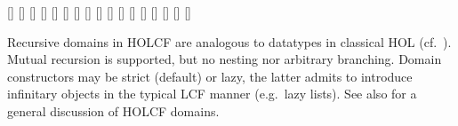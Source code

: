 \begin{isabellebody}
\begin{isamarkuptext}
  \begin{railoutput}
[]
\rail@bar
{}
[]
\rail@endbar
\rail@plus
{}[]
[]
\rail@endplus
\rail@end
{}
[]
[]
\rail@plus
{}[]
[]
\rail@endplus
\rail@end
{}
[]
\rail@plus
{}
[]
\rail@endplus
\rail@bar
{}
[]
\rail@endbar
\rail@end
{}
[]
[]
[]
[]
[]
[]
\rail@end
\end{railoutput}


  Recursive domains in HOLCF are analogous to datatypes in classical
  HOL (cf.\ ).  Mutual recursion is
  supported, but no nesting nor arbitrary branching.  Domain
  constructors may be strict (default) or lazy, the latter admits to
  introduce infinitary objects in the typical LCF manner (e.g.\ lazy
  lists).  See also \cite{MuellerNvOS99} for a general discussion of
  HOLCF domains.%
\end{isamarkuptext}%
\isamarkuptrue%
%
\isadelimtheory
%
\endisadelimtheory
%
\isatagtheory
{}\isamarkupfalse%
%
\endisatagtheory
{\isafoldtheory}%
%
\isadelimtheory
%
\endisadelimtheory
\isanewline
\end{isabellebody}%
